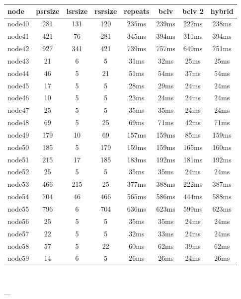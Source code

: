 \begin{tabular}{|l|c|c|c|c|c|c|c|}
\hline node & psrsize & lsrsize & rsrsize   & repeats & bclv & bclv 2 & hybrid\\
    \hline node40 & 281 & 131 & 120 & 235ms & 239ms & 222ms & 238ms\\
    \hline node41 & 421 & 76 & 281 & 345ms & 394ms & 311ms & 394ms\\
    \hline node42 & 927 & 341 & 421 & 739ms & 757ms & 649ms & 751ms\\
    \hline node43 & 21 & 6 & 5 & 31ms & 32ms & 25ms & 25ms\\
    \hline node44 & 46 & 5 & 21 & 51ms & 54ms & 37ms & 54ms\\
    \hline node45 & 17 & 5 & 5 & 28ms & 29ms & 24ms & 24ms\\
    \hline node46 & 10 & 5 & 5 & 23ms & 24ms & 24ms & 24ms\\
    \hline node47 & 25 & 5 & 5 & 35ms & 35ms & 24ms & 24ms\\
    \hline node48 & 69 & 5 & 25 & 69ms & 71ms & 42ms & 71ms\\
    \hline node49 & 179 & 10 & 69 & 157ms & 159ms & 85ms & 159ms\\
    \hline node50 & 185 & 5 & 179 & 159ms & 159ms & 165ms & 160ms\\
    \hline node51 & 215 & 17 & 185 & 183ms & 192ms & 181ms & 192ms\\
    \hline node52 & 25 & 5 & 5 & 35ms & 35ms & 24ms & 24ms\\
    \hline node53 & 466 & 215 & 25 & 377ms & 388ms & 222ms & 387ms\\
    \hline node54 & 704 & 46 & 466 & 565ms & 586ms & 444ms & 588ms\\
    \hline node55 & 796 & 6 & 704 & 636ms & 623ms & 599ms & 623ms\\
    \hline node56 & 25 & 5 & 5 & 35ms & 35ms & 24ms & 24ms\\
    \hline node57 & 22 & 5 & 5 & 32ms & 33ms & 24ms & 24ms\\
    \hline node58 & 57 & 5 & 22 & 60ms & 62ms & 39ms & 62ms\\
    \hline node59 & 14 & 6 & 5 & 26ms & 26ms & 24ms & 26ms\\

\hline
\end{tabular} \

---



